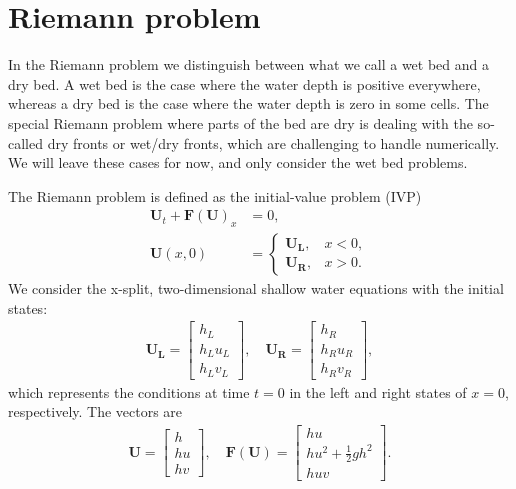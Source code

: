 \section{Riemann problem}
In the Riemann problem we distinguish between what we call a wet bed and a dry bed. 
A wet bed is the case where the water depth is positive everywhere, whereas a dry bed is the case where the water depth is zero in some cells.
The special Riemann problem where parts of the bed are dry is dealing with the so-called dry fronts or wet/dry fronts, which are challenging to handle numerically.
We will leave these cases for now, and only consider the wet bed problems.

The Riemann problem is defined as the initial-value problem (IVP)
\begin{align}\label{eq:Riemann_problem}
    \mathbf{U}_t + {\mathbf{F(U)}}_x &= 0, \\
\mathbf{U}(x, 0) &= \begin{cases}
    \mathbf{U_L}, & x < 0, \\
    \mathbf{U_R}, & x > 0.
\end{cases}
\end{align}
We consider the x-split, two-dimensional shallow water equations with the initial states:
\begin{align*}
    \mathbf{U_L} = \begin{bmatrix}
        h_L \\ h_L u_L \\ h_L v_L
    \end{bmatrix}, \quad 
    \mathbf{U_R} = \begin{bmatrix}
        h_R \\ h_R u_R \\ h_R v_R
    \end{bmatrix},
\end{align*}
which represents the conditions at time $t = 0$ in the left and right states of $x=0$, respectively.
The vectors are
\begin{align*}
    \mathbf{U} = \begin{bmatrix}
        h \\ hu \\ hv
    \end{bmatrix}, \quad 
    \mathbf{F(U)} = \begin{bmatrix}
        hu \\ hu^2 + \frac{1}{2}gh^2 \\ huv
    \end{bmatrix}.
\end{align*}

